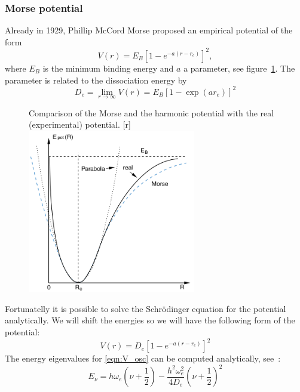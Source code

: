\subsubsection{Morse potential}
Already in 1929, Phillip McCord Morse proposed an empirical potential
of the form \cite{Demtroeder1}
\begin{equation}
    V(r) = E_B \left[ 1 - e^{-a(r-r_e)}  \right]^2,
\end{equation}
where $E_B$ is the minimum binding energy and $a$ a parameter,
see figure~\ref{fig:Morse}. The parameter is related to the
dissociation energy by 
\begin{equation}
    D_e = \lim\limits_{r \rightarrow \infty}{V(r)}
        = E_B \left[ 1 - \exp(a r_e)  \right]^2
\end{equation}
\begin{figure}[!t]
    \begin{captionbeside}[]{
        Comparison of the Morse and the harmonic potential
        with the real (experimental) potential\cite{Demtroeder1}.
        }[r]
        \includegraphics[width=0.65\textwidth]{pics/Morse_potential}
    \end{captionbeside}
    \label{fig:Morse}
\end{figure}
Fortunatelly it is possible to solve the Schrödinger equation
for the potential analytically. We will shift the energies 
so we will have the following form of the potential:
\begin{equation}
    V(r) = D_e \left[ 1 - e^{-a(r-r_e)}  \right]^2
\end{equation}
The energy eigenvalues for \eqref{eqn:V_osc} can be computed analytically, 
see~\cite{fliessbach2008quantenmechanik}:
\begin{equation}
    E_\nu = h \omega_{e} \left( \nu + \frac{1}{2}
        \right) - \frac{h^2 \omega_{e}^2}{4 D_e} 
    \left( \nu + \frac{1}{2} \right)^2
\end{equation}
